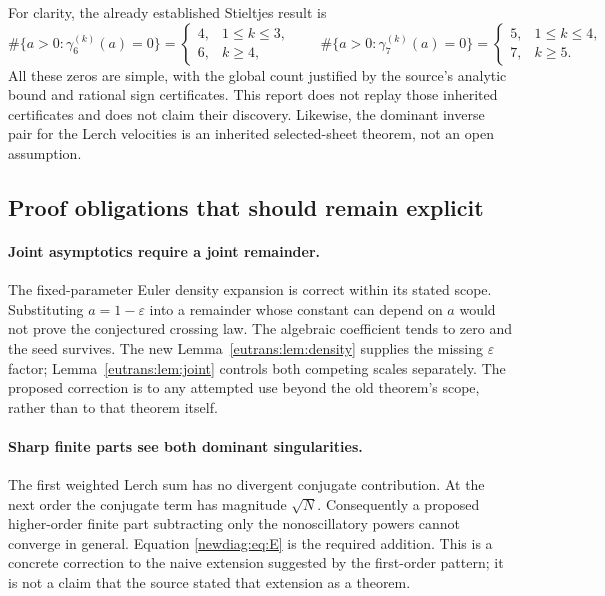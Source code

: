 For clarity, the already established Stieltjes result is
\[
 \#\{a>0:\gamma_6^{(k)}(a)=0\}=
 \begin{cases}4,&1\leq k\leq3,\\6,&k\geq4,\end{cases}
 \qquad
 \#\{a>0:\gamma_7^{(k)}(a)=0\}=
 \begin{cases}5,&1\leq k\leq4,\\7,&k\geq5.
 \end{cases}
\]
All these zeros are simple, with the global count justified by the
source's analytic bound and rational sign certificates. This report does
not replay those inherited certificates and does not claim their
discovery. Likewise, the dominant inverse pair for the Lerch velocities
is an inherited selected-sheet theorem, not an open assumption.

\subsection{Proof obligations that should remain explicit}

\paragraph{Joint asymptotics require a joint remainder.}
The fixed-parameter Euler density expansion is correct within its stated
scope. Substituting $a=1-\varepsilon$ into a remainder whose constant can
depend on $a$ would not prove the conjectured crossing law. The algebraic
coefficient tends to zero and the seed survives. The new
Lemma~\ref{eutrans:lem:density} supplies the missing $\varepsilon$ factor;
Lemma~\ref{eutrans:lem:joint} controls both competing scales separately.
The proposed correction is to any attempted use beyond the old theorem's
scope, rather than to that theorem itself.

\paragraph{Sharp finite parts see both dominant singularities.}
The first weighted Lerch sum has no divergent conjugate contribution.
At the next order the conjugate term has magnitude $\sqrt N$.
Consequently a proposed higher-order finite part subtracting only the
nonoscillatory powers cannot converge in general. Equation
\eqref{newdiag:eq:E} is the required addition. This is a concrete
correction to the naive extension suggested by the first-order pattern;
it is not a claim that the source stated that extension as a theorem.

